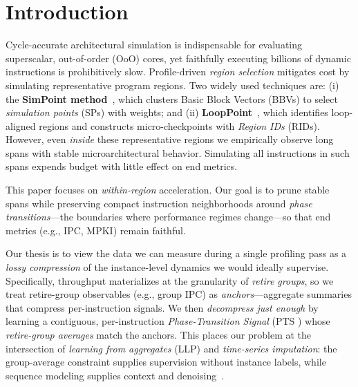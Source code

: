 \documentclass[conference]{IEEEtran}
\newcommand{\pts}{\textsc{PTS} }
\begin{document}
\maketitle

\section{Introduction}
\label{sec:intro}

Cycle-accurate architectural simulation is indispensable for evaluating superscalar, out-of-order (OoO) cores, yet faithfully executing billions of dynamic instructions is prohibitively slow. Profile-driven \emph{region selection} mitigates cost by simulating representative program regions. Two widely used techniques are: (i) the \textbf{SimPoint method}~\cite{simpoint-asplos02,simpoint03,simpoint-howto}, which clusters Basic Block Vectors (BBVs) to select \emph{simulation points} (SPs) with weights; and (ii) \textbf{LoopPoint}~\cite{looppoint-hpca22}, which identifies loop-aligned regions and constructs micro-checkpoints with \emph{Region IDs} (RIDs). However, even \emph{inside} these representative regions we empirically observe long spans with stable microarchitectural behavior. Simulating all instructions in such spans expends budget with little effect on end metrics.

This paper focuses on \emph{within-region} acceleration. Our goal is to prune stable spans while preserving compact instruction neighborhoods around \emph{phase transitions}—the boundaries where performance regimes change—so that end metrics (e.g., IPC, MPKI) remain faithful.

Our thesis is to view the data we can measure during a single profiling pass as a \emph{lossy compression} of the instance-level dynamics we would ideally supervise. Specifically, throughput materializes at the granularity of \emph{retire groups}, so we treat retire-group observables (e.g., group IPC) as \emph{anchors}—aggregate summaries that compress per-instruction signals. We then \emph{decompress just enough} by learning a contiguous, per-instruction \emph{Phase-Transition Signal} (\pts) whose \emph{retire-group averages} match the anchors. This places our problem at the intersection of \emph{learning from aggregates} (LLP) and \emph{time-series imputation}: the group-average constraint supplies supervision without instance labels, while sequence modeling supplies context and denoising~\cite{yu2014-llp,scott2020-llp,law2018-agg,zhang2020-agg}.
\end{document}
